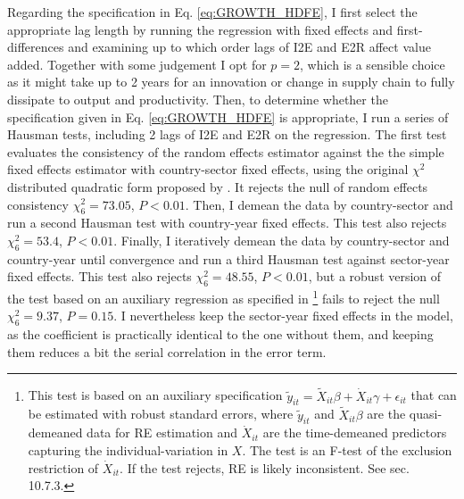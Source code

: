\documentclass[a4paper]{article}
\begin{document}
Regarding the specification in Eq. \ref{eq:GROWTH_HDFE}, I first select the appropriate lag length by running the regression with fixed effects and first-differences and examining up to which order lags of I2E and E2R affect value added. Together with some judgement I opt for $p = 2$, which is a sensible choice as it might take up to 2 years for an innovation or change in supply chain to fully dissipate to output and productivity. Then, to determine whether the specification given in Eq. \ref{eq:GROWTH_HDFE} is appropriate, I run a series of Hausman tests, including 2 lags of I2E and E2R on the regression. The first test evaluates the consistency of the random effects estimator against the the  simple fixed effects estimator with country-sector fixed effects, using the original $\chi^2$ distributed quadratic form proposed by \citet{hausman1978specification}. It rejects the null of random effects consistency $\chi^2_6 = 73.05$, $P < 0.01$. Then, I demean the data by country-sector and run a second Hausman test with country-year fixed effects. This test also rejects $\chi^2_6 = 53.4$, $P < 0.01$. Finally, I iteratively demean the data by country-sector and country-year until convergence and run a third Hausman test against sector-year fixed effects. This test also rejects $\chi^2_6 = 48.55$, $P < 0.01$, but a robust version of the test based on an auxiliary regression as specified in \citet{wooldridge2010econometric}\footnote{This test is based on an auxiliary specification $\tilde{y}_{it} = \tilde{X}_{it}\beta + \dot{X}_{it}\gamma + \epsilon_{it}$ that can be estimated with robust standard errors, where  $\tilde{y}_{it} $ and $\tilde{X}_{it}\beta$ are the quasi-demeaned data for RE estimation and $\dot{X}_{it}$ are the time-demeaned predictors capturing the individual-variation in $X$. The test is an F-test of the exclusion restriction of $\dot{X}_{it}$. If the test rejects, RE is likely inconsistent. See \citet{wooldridge2010econometric} sec. 10.7.3.} fails to reject the null $\chi^2_6 = 9.37$, $P = 0.15$. I nevertheless keep the sector-year fixed effects in the model, as the coefficient is practically identical to the one without them, and keeping them reduces a bit the serial correlation in the error term. \newline
\end{document}

